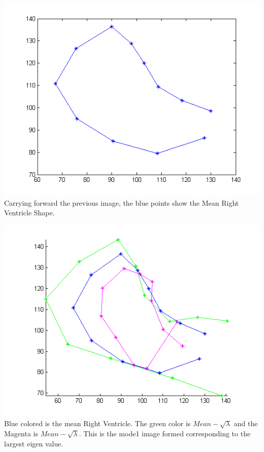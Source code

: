 \documentclass[paper=a4, fontsize=11pt,twoside]{scrartcl}	%
\begin{document}
\includegraphics{HeartMean.png}
Carrying forward the previous image, the blue points show the Mean Right Ventricle Shape.

\includegraphics{HeartMode1.png}
Blue colored is the mean Right Ventricle. The green color is $Mean - \sqrt{\lambda}$ and the Magenta is $Mean - \sqrt{\lambda}$. This is the mode1 image formed corresponding to the largest eigen value. 
\end{document}
